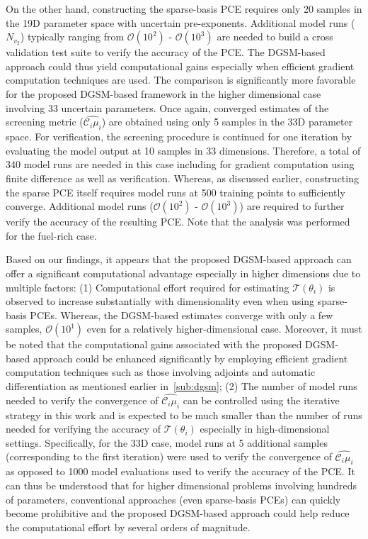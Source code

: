 On the other hand, constructing the sparse-basis PCE requires only 20 samples in
the 19D parameter space with uncertain pre-exponents. Additional model runs ($N_{v_2}$)
 typically ranging from
$\mathcal{O}(10^{2})$ - $\mathcal{O}(10^{3})$ are needed to build a cross validation test suite to verify the 
accuracy of the PCE.  
The DGSM-based approach could thus yield computational gains especially when 
efficient gradient computation techniques are used. The comparison is significantly more favorable for the 
proposed DGSM-based framework in the higher dimensional case involving 33 uncertain parameters. 
Once again, converged estimates of the screening metric ($\widehat{\mathcal{C}_i\mu_i}$) are obtained
using only 5 samples in the 33D parameter space. For verification, the screening procedure is
continued for one iteration by evaluating the model output at 10 samples in 33 dimensions. 
Therefore, a total of 340 model runs are needed in this case
including for gradient computation using finite difference as well as verification. Whereas, as discussed earlier,
constructing the sparse PCE itself requires model runs at 500 training points to sufficiently converge. Additional
model runs ($\mathcal{O}(10^{2})$ - $\mathcal{O}(10^{3})$) are required to further verify the accuracy of the 
resulting PCE. Note that the analysis was performed
for the fuel-rich case. 

Based on our findings, it appears that the proposed DGSM-based approach can offer a significant
computational advantage especially in higher dimensions due to multiple factors: (1) Computational
effort required for estimating $\mathcal{T}(\theta_i)$ is observed to increase substantially with dimensionality even
when using sparse-basis PCEs. Whereas, the DGSM-based estimates converge
with only a few samples, $\mathcal{O}(10^1)$ even for a relatively higher-dimensional case. Moreover, it must be noted that
the computational gains associated with the proposed DGSM-based approach could be enhanced
significantly by employing efficient gradient computation techniques such as those involving adjoints
and automatic differentiation as mentioned earlier in~\ref{sub:dgsm}; (2) The number of model runs
needed to verify the convergence of $\widehat{\mathcal{C}_i\mu_i}$ can be controlled
using the iterative strategy in this work
and is expected to be much smaller than the number of runs needed for verifying the accuracy of  
$\mathcal{T}(\theta_i)$ especially in high-dimensional settings. Specifically, for the 33D case,
model runs at 5 additional samples (corresponding to the first iteration) were used to verify the
convergence of $\widehat{\mathcal{C}_i\mu_i}$ as opposed to 1000 model evaluations used to verify
the accuracy of the PCE. 
It can thus be understood that for higher dimensional problems involving hundreds of 
parameters, conventional approaches (even sparse-basis PCEs) can quickly become prohibitive and
the proposed DGSM-based approach could help
reduce the computational effort by several orders of magnitude. 
